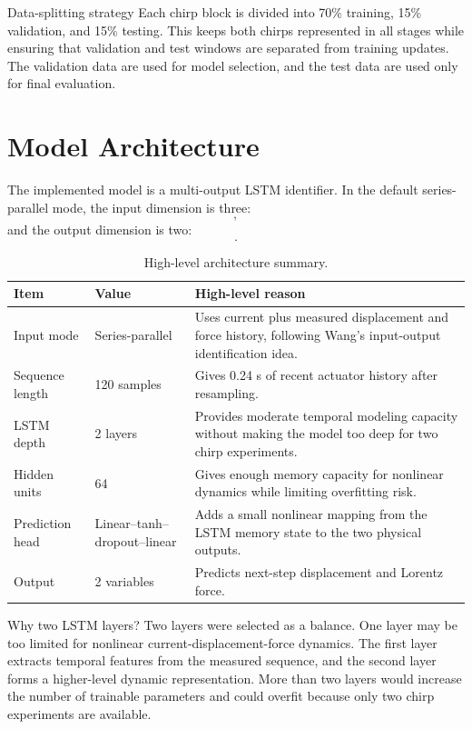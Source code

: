 \documentclass[11pt]{article}
\begin{document}
\begin{databox}{Data-splitting strategy}
Each chirp block is divided into 70\% training, 15\% validation, and 15\% testing. This keeps both chirps represented in all stages while ensuring that validation and test windows are separated from training updates. The validation data are used for model selection, and the test data are used only for final evaluation.
\end{databox}

\section{Model Architecture}
The implemented model is a multi-output LSTM identifier. In the default series-parallel mode, the input dimension is three:
\begin{equation}
[I(k),x(k),F(k)],
\end{equation}
and the output dimension is two:
\begin{equation}
[\hat{x}(k+1),\hat{F}(k+1)].
\end{equation}

\begin{table}[H]
\centering
\small
\begin{tabular}{p{4cm}p{3cm}p{7cm}}
\toprule
Item & Value & High-level reason \\
\midrule
Input mode & Series-parallel & Uses current plus measured displacement and force history, following Wang's input-output identification idea. \\
Sequence length & 120 samples & Gives 0.24 s of recent actuator history after resampling. \\
LSTM depth & 2 layers & Provides moderate temporal modeling capacity without making the model too deep for two chirp experiments. \\
Hidden units & 64 & Gives enough memory capacity for nonlinear dynamics while limiting overfitting risk. \\
Prediction head & Linear--tanh--dropout--linear & Adds a small nonlinear mapping from the LSTM memory state to the two physical outputs. \\
Output & 2 variables & Predicts next-step displacement and Lorentz force. \\
\bottomrule
\end{tabular}
\caption{High-level architecture summary.}
\label{tab:arch_summary}
\end{table}

\begin{archbox}{Why two LSTM layers?}
Two layers were selected as a balance. One layer may be too limited for nonlinear current-displacement-force dynamics. The first layer extracts temporal features from the measured sequence, and the second layer forms a higher-level dynamic representation. More than two layers would increase the number of trainable parameters and could overfit because only two chirp experiments are available.
\end{archbox}
\end{document}
